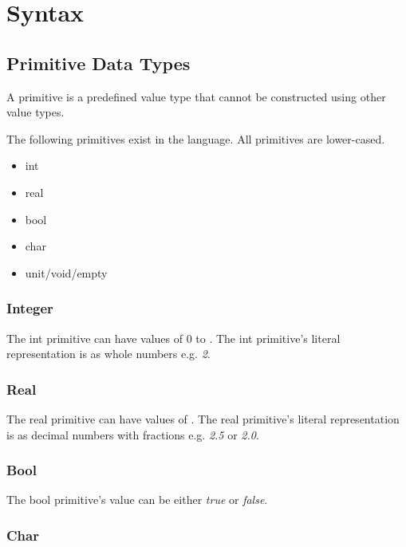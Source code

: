 \section{Syntax}
\label{sec:syntax}

\subsection{Primitive Data Types}
\label{subsec:primitives}

A primitive is a predefined value type that cannot be constructed using other value types.

The following primitives exist in the language. All primitives are lower-cased.

\begin{itemize}
  \item int
  \item real
  \item bool
  \item char
  \item unit/void/empty 
\end{itemize}

\subsubsection{Integer}
\label{subsubsec:int}

The int primitive can have values of 0 to . The int primitive's literal representation is as whole numbers e.g. \emph{2}.

\subsubsection{Real}
\label{subsubsec:real}

The real primitive can have values of . The real primitive's literal representation is as decimal numbers with fractions e.g. \emph{2.5} or \emph{2.0}.

\subsubsection{Bool}
\label{subsubsec:bool}

The bool primitive's value can be either \emph{true} or \emph{false}.

\subsubsection{Char}
\label{sec:char}

